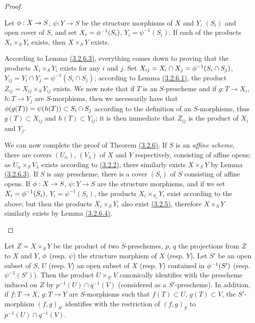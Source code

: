 \begin{proof}
\begin{lem}[3.2.6.4]
\label{lem-1.3.2.6.4}
Let $\phi:X\to S$, $\psi:Y\to S$ be the structure morphisms of $X$ and $Y$, $(S_i)$ and open
cover of $S$, and set $X_i=\phi^{-1}(S_i)$, $Y_i=\psi^{-1}(S_i)$. If each of the products
$X_i\times_S Y_i$ exists, then $X\times_S Y$ exists.
\end{lem}

According to Lemma \hyperref[lem-1.3.2.6.3]{(3.2.6.3)}, everything comes down to proving that the products
$X_i\times_S Y_i$ exists for any $i$ and $j$. Set
$X_{ij}=X_i\cap X_j=\phi^{-1}(S_i\cap S_j)$, $Y_{ij}=Y_i\cap Y_j=\psi^{-1}(S_i\cap S_j)$;
according to Lemma \hyperref[lem-1.3.2.6.1]{(3.2.6.1)}, the product $Z_{ij}=X_{ij}\times_S Y_{ij}$ exists. We now
note that if $T$ is an $S$-prescheme and if $g:T\to X_i$, $h:T\to Y_j$ are $S$-morphisms,
then we necessarily have that $\phi(g(T))=\psi(h(T))\subset S_i\cap S_j$ according to the
definition of an $S$-morphisms, thus $g(T)\subset X_{ij}$ and $h(T)\subset Y_{ij}$; it is
then immediate that $Z_{ij}$ is the product of $X_i$ and $Y_j$.

\begin{env}[3.2.6.5]
\label{env-1.3.2.6.5}
We can now complete the proof of Theorem \hyperref[thm-1.3.2.6]{(3.2.6)}. If $S$ is an {\em affine
scheme}, there are covers $(U_\alpha)$, $(V_\lambda)$ of $X$ and $Y$ respectively,
consisting of affine opens; as $U_\alpha\times_S V_\lambda$ exists according to
\hyperref[prop-1.3.2.2]{(3.2.2)}, there similarly exists $X\times_S Y$ by Lemma \hyperref[lem-1.3.2.6.3]{(3.2.6.3)}. If $S$
is any prescheme, there is a cover $(S_i)$ of $S$ consisting of affine opens. If
$\phi:X\to S$, $\psi:Y\to S$ are the structure morphisms, and if we set
$X_i=\phi^{-1}(S_i)$, $Y_i=\psi^{-1}(S_i)$, the products $X_i\times_{S_i}Y_i$ exist
according to the
above; but then the products $X_i\times_S Y_i$ also exist \hyperref[cor-1.3.2.5]{(3.2.5)}, therefore
$X\times_S Y$ similarly exists by Lemma \hyperref[lem-1.3.2.6.4]{(3.2.6.4)}.
\end{env}
\end{proof}

\begin{cor}[3.2.7]
\label{cor-1.3.2.7}
Let $Z=X\times_S Y$ be the product of two $S$-preschemes, $p$, $q$ the projections from $Z$
to $X$ and $Y$, $\phi$ (resp. $\psi$) the structure morphism of $X$ (resp. $Y$). Let $S'$ be
an open subset of $S$, $U$ (resp. $V$) an open subset of $X$ (resp. $Y$) contained in
$\phi^{-1}(S')$ (resp. $\psi^{-1}(S')$). Then the product $U\times_{S'}V$ canonically
identifies with the prescheme induced on $Z$ by $p^{-1}(U)\cap q^{-1}(V)$ (considered as a
$S'$-prescheme). In addition, if $f:T\to X$, $g:T\to Y$ are $S$-morphisms such that
$f(T)\subset U$, $g(T)\subset V$, the $S'$-morphism $(f,g)_{S'}$ identifies with the
restriction of $(f,g)_S$ to $p^{-1}(U)\cap q^{-1}(V)$.
\end{cor}

